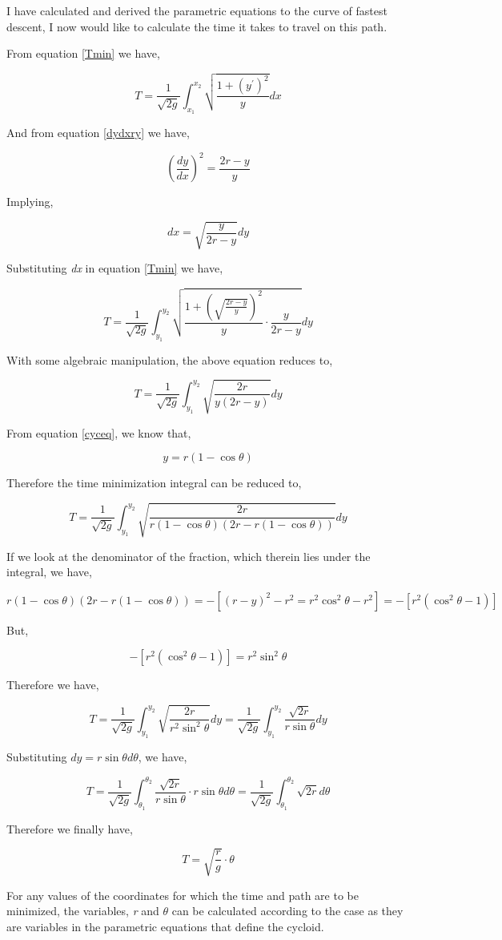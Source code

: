 

{I have calculated and derived the parametric equations to the curve of fastest descent, I now would like to calculate the time it takes to travel on this path.}

{From equation \ref{Tmin} we have,}

	$$T = \frac{1}{\sqrt{2g}}\int_{x_1}^{x_2} \sqrt{\frac{1 + \left(y^{\prime}\right)^2}{y}} dx$$

{And from equation \ref{dydxry} we have,}

	$$\left(\frac{dy}{dx}\right)^2 = \frac{2r - y}{y}$$

{Implying,}

	$$dx = \sqrt{\frac{y}{2r - y}}dy$$

{Substituting \textit{dx} in equation \ref{Tmin} we have,}

	$$T = \frac{1}{\sqrt{2g}}\int_{y_1}^{y_2} \sqrt{\frac{1 + \left(\sqrt{\frac{2r - y}{y}}\right)^2}{y}\cdot\frac{y}{2r - y}}dy$$

{With some algebraic manipulation, the above equation reduces to,}

	$$T = \frac{1}{\sqrt{2g}}\int_{y_1}^{y_2}\sqrt{\frac{2r}{y\left(2r -y\right)}}dy$$

{From equation \ref{cyceq}, we know that,}

	$$y = r\left(1 - \cos\theta\right)$$

{Therefore the time minimization integral can be reduced to,}

	$$T = \frac{1}{\sqrt{2g}}\int_{y_1}^{y_2}\sqrt{\frac{2r}{r\left(1 - \cos\theta\right)\left(2r -r\left(1 - \cos\theta\right)\right)}}dy$$

{If we look at the denominator of the fraction, which therein lies under the integral, we have,}

	$$r\left(1 - \cos\theta\right)\left(2r -r\left(1 - \cos\theta\right)\right) = -\left[\left(r - y\right)^2 - r^2 = r^2\cos^2\theta - r^2\right] = -\left[r^2\left(\cos^2\theta - 1\right)\right]$$

{But,}

	$$-\left[r^2\left(\cos^2\theta - 1\right)\right] = r^2\sin^2\theta$$

{Therefore we have,}

	$$T = \frac{1}{\sqrt{2g}}\int_{y_1}^{y_2}\sqrt{\frac{2r}{r^2\sin^2\theta}}dy = \frac{1}{\sqrt{2g}}\int_{y_1}^{y_2}\frac{\sqrt{2r}}{r\sin\theta}dy$$

{Substituting $dy = r\sin\theta d\theta$, we have,}

	$$T = \frac{1}{\sqrt{2g}}\int_{\theta_1}^{\theta_2}\frac{\sqrt{2r}}{r\sin\theta}\cdot r\sin\theta d\theta = \frac{1}{\sqrt{2g}}\int_{\theta_1}^{\theta_2}\sqrt{2r}d\theta$$

{Therefore we finally have,}

	\begin{equation}
		T = \sqrt{\frac{r}{g}}\cdot\theta
		\label{Tcal}
	\end{equation}

{For any values of the coordinates for which the time and path are to be minimized, the variables, \textit{r} and $\theta$ can be calculated according to the case as they are variables in the parametric equations that define the cycloid.}

